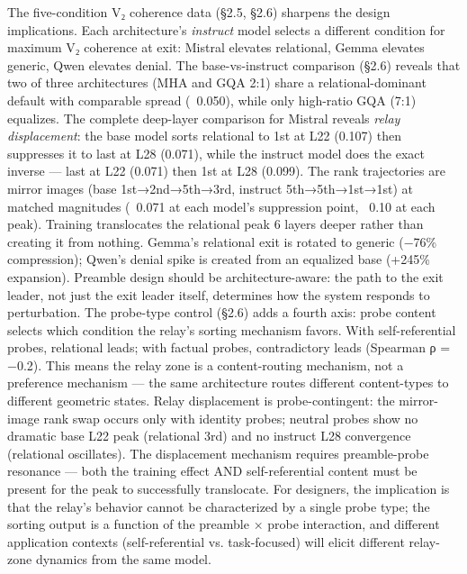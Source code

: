 \documentclass[12pt]{article}
\begin{document}
The five-condition V₂ coherence data (§2.5, §2.6) sharpens the design implications. Each architecture's \textit{instruct} model selects a different condition for maximum V₂ coherence at exit: Mistral elevates relational, Gemma elevates generic, Qwen elevates denial. The base-vs-instruct comparison (§2.6) reveals that two of three architectures (MHA and GQA 2:1) share a relational-dominant default with comparable spread (~0.050), while only high-ratio GQA (7:1) equalizes. The complete deep-layer comparison for Mistral reveals \textit{relay displacement}: the base model sorts relational to 1st at L22 (0.107) then suppresses it to last at L28 (0.071), while the instruct model does the exact inverse — last at L22 (0.071) then 1st at L28 (0.099). The rank trajectories are mirror images (base 1st→2nd→5th→3rd, instruct 5th→5th→1st→1st) at matched magnitudes (~0.071 at each model's suppression point, ~0.10 at each peak). Training translocates the relational peak 6 layers deeper rather than creating it from nothing. Gemma's relational exit is rotated to generic (−76\% compression); Qwen's denial spike is created from an equalized base (+245\% expansion). Preamble design should be architecture-aware: the path to the exit leader, not just the exit leader itself, determines how the system responds to perturbation. The probe-type control (§2.6) adds a fourth axis: probe content selects which condition the relay's sorting mechanism favors. With self-referential probes, relational leads; with factual probes, contradictory leads (Spearman ρ = −0.2). This means the relay zone is a content-routing mechanism, not a preference mechanism — the same architecture routes different content-types to different geometric states. Relay displacement is probe-contingent: the mirror-image rank swap occurs only with identity probes; neutral probes show no dramatic base L22 peak (relational 3rd) and no instruct L28 convergence (relational oscillates). The displacement mechanism requires preamble-probe resonance — both the training effect AND self-referential content must be present for the peak to successfully translocate. For designers, the implication is that the relay's behavior cannot be characterized by a single probe type; the sorting output is a function of the preamble × probe interaction, and different application contexts (self-referential vs. task-focused) will elicit different relay-zone dynamics from the same model.
\end{document}
